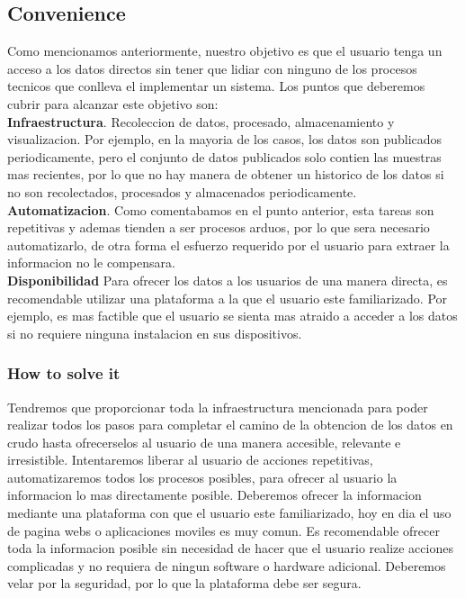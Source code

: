 \subsection{Convenience}
Como mencionamos anteriormente, nuestro objetivo es que el usuario tenga un acceso a los datos directos sin tener que lidiar con ninguno
de los procesos tecnicos que conlleva el implementar un sistema. Los puntos que deberemos cubrir para alcanzar este objetivo son:\\
\textbf{Infraestructura}. Recoleccion de datos, procesado, almacenamiento y visualizacion. Por ejemplo, en la mayoria de los casos, los datos son 
publicados periodicamente, pero el conjunto de datos publicados solo contien las muestras mas recientes, por lo que no hay manera de obtener 
un historico de los datos si no son recolectados, procesados y almacenados periodicamente. \\
\textbf{Automatizacion}. Como comentabamos en el punto anterior, esta tareas son repetitivas y ademas tienden a ser procesos arduos, por lo que sera
necesario automatizarlo, de otra forma el esfuerzo requerido por el usuario para extraer la informacion no le compensara. \\
\textbf{Disponibilidad} Para ofrecer los datos a los usuarios de una manera directa, es recomendable utilizar una plataforma a la que el usuario
este familiarizado. Por ejemplo, es mas factible que el usuario se sienta mas atraido a acceder a los datos si no requiere
ninguna instalacion en sus dispositivos.\\

\subsubsection{How to solve it} 
Tendremos que proporcionar toda la infraestructura mencionada para poder realizar todos los pasos para completar el camino de la obtencion de los
datos en crudo hasta ofrecerselos al usuario de una manera accesible, relevante e irresistible.
Intentaremos liberar al usuario de acciones repetitivas, automatizaremos todos los procesos posibles, para ofrecer al usuario la informacion lo mas
directamente posible.
Deberemos ofrecer la informacion mediante una plataforma con que el usuario este familiarizado, hoy en dia el uso de pagina webs o aplicaciones moviles es muy comun.
Es recomendable ofrecer toda la informacion posible sin necesidad de hacer que el usuario realize acciones complicadas y no requiera de ningun software o hardware adicional.
Deberemos velar por la seguridad, por lo que la plataforma debe ser segura.

